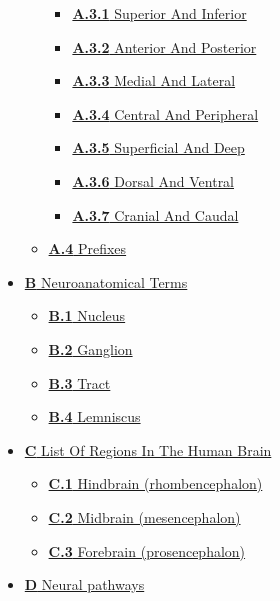 \begin{itemize}
\begin{itemize}
    \begin{itemize}
    \tightlist
    \item
      \href{anatomical-terms-of-location.html\#superior-and-inferior}{\emph{}\textbf{A.3.1}
      Superior And Inferior}
    \item
      \href{anatomical-terms-of-location.html\#anterior-and-posterior}{\emph{}\textbf{A.3.2}
      Anterior And Posterior}
    \item
      \href{anatomical-terms-of-location.html\#medial-and-lateral}{\emph{}\textbf{A.3.3}
      Medial And Lateral}
    \item
      \href{anatomical-terms-of-location.html\#central-and-peripheral}{\emph{}\textbf{A.3.4}
      Central And Peripheral}
    \item
      \href{anatomical-terms-of-location.html\#superficial-and-deep}{\emph{}\textbf{A.3.5}
      Superficial And Deep}
    \item
      \href{anatomical-terms-of-location.html\#dorsal-and-ventral}{\emph{}\textbf{A.3.6}
      Dorsal And Ventral}
    \item
      \href{anatomical-terms-of-location.html\#cranial-and-caudal}{\emph{}\textbf{A.3.7}
      Cranial And Caudal}
    \end{itemize}
  \item
    \href{anatomical-terms-of-location.html\#prefixes}{\emph{}\textbf{A.4}
    Prefixes}
  \end{itemize}
\item
  \href{neuroanatomical-terms.html}{\emph{}\textbf{B} Neuroanatomical
  Terms}

  \begin{itemize}
  \tightlist
  \item
    \href{neuroanatomical-terms.html\#nucleus}{\emph{}\textbf{B.1}
    Nucleus}
  \item
    \href{neuroanatomical-terms.html\#ganglion}{\emph{}\textbf{B.2}
    Ganglion}
  \item
    \href{neuroanatomical-terms.html\#tract}{\emph{}\textbf{B.3} Tract}
  \item
    \href{neuroanatomical-terms.html\#lemniscus}{\emph{}\textbf{B.4}
    Lemniscus}
  \end{itemize}
\item
  \href{list-of-regions-in-the-human-brain.html}{\emph{}\textbf{C} List
  Of Regions In The Human Brain}

  \begin{itemize}
  \tightlist
  \item
    \href{list-of-regions-in-the-human-brain.html\#hindbrain-rhombencephalon}{\emph{}\textbf{C.1}
    Hindbrain (rhombencephalon)}
  \item
    \href{list-of-regions-in-the-human-brain.html\#midbrain-mesencephalon}{\emph{}\textbf{C.2}
    Midbrain (mesencephalon)}
  \item
    \href{list-of-regions-in-the-human-brain.html\#forebrain-prosencephalon}{\emph{}\textbf{C.3}
    Forebrain (prosencephalon)}
  \end{itemize}
\item
  \href{neural-pathways.html}{\emph{}\textbf{D} Neural pathways}


\end{itemize}
